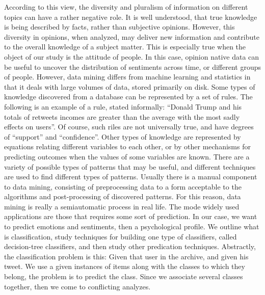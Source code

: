 \documentclass{acmtog} %
\begin{document}
According to this view, the diversity and pluralism of information on different topics can have a rather negative role. It is well understood, that true knowledge is being described by facts, rather than subjective opinions. However, this diversity in opinions, when analyzed, may deliver new information and contribute to the overall knowledge of a subject matter. This is especially true when the object of our study is the attitude of people. In this case, opinion native data can be useful to uncover the distribution of sentiments across time, or different groups of people. However, data mining differs from machine learning and statistics in that it deals with large volumes of data, stored primarily on disk. Some types of knowledge discovered from a database can be represented by a set of rules. The following is an example of a rule, stated informally: “Donald Trump and his totals of retweets incomes are greater than the average with the most sadly effects on users”. Of course, such riles are not universally true, and have degrees of “support” and “confidence”. Other types of knowledge are represented by equations relating different variables to each other, or by other mechanisms for predicting outcomes when the values of some variables are known. There are a variety of possible types of patterns that may be useful, and different techniques are used to find different types of patterns. Usually there is a manual component to data mining, consisting of preprocessing data to a form acceptable to the algorithms and post-processing of discovered patterns. For this reason, data mining is really a semiautomatic process in real life. The mode widely used applications are those that requires some sort of prediction. In our case, we want to predict emotions and sentiments, then a psychological profile. We outline what is classification, study techniques for building one type of classifiers, called decision-tree classifiers, and then study other predication techniques. Abstractly, the classification problem is this: Given that user in the archive, and given his tweet. We use a given instances of items along with the classes to which they belong, the problem is to predict the class. Since we associate several classes together, then we come to conflicting analyzes. 
\end{document}
